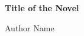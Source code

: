 \begin{titlepage}
  \centering
  \vspace*{2cm}
  {\Huge\bfseries Title of the Novel \par}
  \vspace{2cm}
  {\Large Author Name \par}
\end{titlepage}
